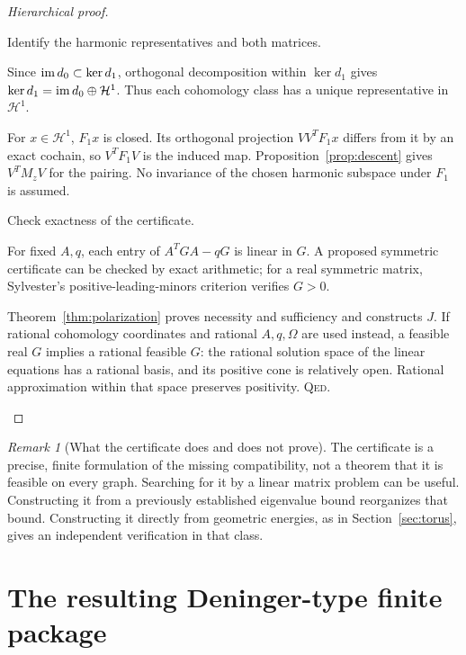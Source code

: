 \documentclass[11pt,a4paper]{article}
\theoremstyle{remark}\newtheorem{remark}[definition]{Remark}
\newcommand{\QED}{\textsc{Qed}}
\begin{document}
\begin{proof}[Hierarchical proof]
\begin{steps}
\item Identify the harmonic representatives and both matrices.
\begin{steps}
\item Since $\operatorname{im} d_0\subset\ker d_1$, orthogonal decomposition within $\ker d_1$ gives
$\ker d_1=\operatorname{im} d_0\oplus\mathcal H^1$. Thus each cohomology class has a unique representative in $\mathcal H^1$.
\item For $x\in\mathcal H^1$, $F_1x$ is closed. Its orthogonal projection $VV^TF_1x$ differs from it by an exact cochain, so $V^TF_1V$ is the induced map. Proposition~\ref{prop:descent} gives $V^TM_zV$ for the pairing. No invariance of the chosen harmonic subspace under $F_1$ is assumed.
\end{steps}
\item Check exactness of the certificate.
\begin{steps}
\item For fixed $A,q$, each entry of $A^TGA-qG$ is linear in $G$. A proposed symmetric certificate can be checked by exact arithmetic; for a real symmetric matrix, Sylvester's positive-leading-minors criterion verifies $G>0$.
\item Theorem~\ref{thm:polarization} proves necessity and sufficiency and constructs $J$. If rational cohomology coordinates and rational $A,q,\Omega$ are used instead, a feasible real $G$ implies a rational feasible $G$: the rational solution space of the linear equations has a rational basis, and its positive cone is relatively open. Rational approximation within that space preserves positivity. \QED.
\end{steps}
\end{steps}
\end{proof}

\begin{remark}[What the certificate does and does not prove]
The certificate is a precise, finite formulation of the missing compatibility, not a theorem that it is feasible on every graph. Searching for it by a linear matrix problem can be useful. Constructing it from a previously established eigenvalue bound reorganizes that bound. Constructing it directly from geometric energies, as in Section~\ref{sec:torus}, gives an independent verification in that class.
\end{remark}

\section{The resulting Deninger-type finite package}
\end{document}
